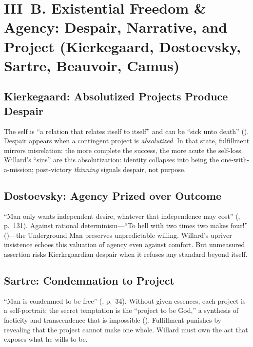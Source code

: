 \section*{III–B. Existential Freedom \& Agency: Despair, Narrative, and Project (Kierkegaard, Dostoevsky, Sartre, Beauvoir, Camus)}
\label{sec:iii-b-existential-freedom-agency-despair-narrative-and-project-kierkegaard-dostoevsky-sartre-beauvoir-camus}

\subsection*{Kierkegaard: Absolutized Projects Produce Despair}
\label{ssec:kierkegaard-absolutized-projects-produce-despair}
The self is “a relation that relates itself to itself” and can be “sick unto death” (\parencite[pp.~49--52]{KierkegaardSUD1980}). Despair appears when a contingent project is \emph{absolutized}. In that state, fulfillment mirrors misrelation: the more complete the success, the more acute the self-loss. Willard’s “sins” are this absolutization: identity collapses into being the one-with-a-mission; post-victory \emph{thinning} signals despair, not purpose.

\subsection*{Dostoevsky: Agency Prized over Outcome}
\label{ssec:dostoevsky-agency-prized-over-outcome}
“Man only wants independent desire, whatever that independence may cost” (\parencite{DostoevskyNFU1994}, p.~131). Against rational determinism—“To hell with two times two makes four!” (\parencite[p.~129]{DostoevskyNFU1994})—the Underground Man preserves unpredictable willing. Willard’s upriver insistence echoes this valuation of agency even against comfort. But unmeasured assertion risks Kierkegaardian despair when it refuses any standard beyond itself.

\subsection*{Sartre: Condemnation to Project}
\label{ssec:sartre-condemnation-to-project}
“Man is condemned to be free” (\parencite{SartreBN2003}, p.~34). Without given essences, each project is a self-portrait; the secret temptation is the “project to be God,” a synthesis of facticity and transcendence that is impossible (\parencite[p.~604]{SartreBN2003}). Fulfillment punishes by revealing that the project cannot make one whole. Willard must own the act that exposes what he wills to be.

